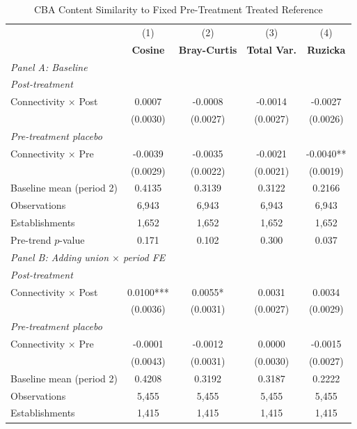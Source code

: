 \begin{table}[H]
\centering
\caption{CBA Content Similarity to Fixed Pre-Treatment Treated Reference}
\label{tab:pretreat_ref_uncorr_w_cba_similarity}
\scriptsize
\setlength{\tabcolsep}{8pt}
\begin{tabular}{lcccc}
\hline\hline
 & (1) & (2) & (3) & (4) \\
 & \textbf{Cosine} & \textbf{Bray-Curtis} & \textbf{Total Var.} & \textbf{Ruzicka} \\
\hline
\multicolumn{5}{l}{\textit{Panel A: Baseline}} \\
\multicolumn{5}{l}{\textit{Post-treatment}} \\
Connectivity $\times$ Post & 0.0007 & -0.0008 & -0.0014 & -0.0027 \\
 & (0.0030) & (0.0027) & (0.0027) & (0.0026) \\
\multicolumn{5}{l}{\textit{Pre-treatment placebo}} \\
Connectivity $\times$ Pre & -0.0039 & -0.0035 & -0.0021 & -0.0040** \\
 & (0.0029) & (0.0022) & (0.0021) & (0.0019) \\
\hline
Baseline mean (period 2) & 0.4135 & 0.3139 & 0.3122 & 0.2166 \\
Observations &        6,943 &        6,943 &        6,943 &        6,943 \\
Establishments &        1,652 &        1,652 &        1,652 &        1,652 \\
Pre-trend $p$-value & 0.171 & 0.102 & 0.300 & 0.037 \\
\hline
\multicolumn{5}{l}{\textit{Panel B: Adding union $\times$ period FE}} \\
\multicolumn{5}{l}{\textit{Post-treatment}} \\
Connectivity $\times$ Post & 0.0100*** & 0.0055* & 0.0031 & 0.0034 \\
 & (0.0036) & (0.0031) & (0.0027) & (0.0029) \\
\multicolumn{5}{l}{\textit{Pre-treatment placebo}} \\
Connectivity $\times$ Pre & -0.0001 & -0.0012 & 0.0000 & -0.0015 \\
 & (0.0043) & (0.0031) & (0.0030) & (0.0027) \\
\hline
Baseline mean (period 2) & 0.4208 & 0.3192 & 0.3187 & 0.2222 \\
Observations &        5,455 &        5,455 &        5,455 &        5,455 \\
Establishments &        1,415 &        1,415 &        1,415 &        1,415 \\

\end{tabular}
\end{table}
